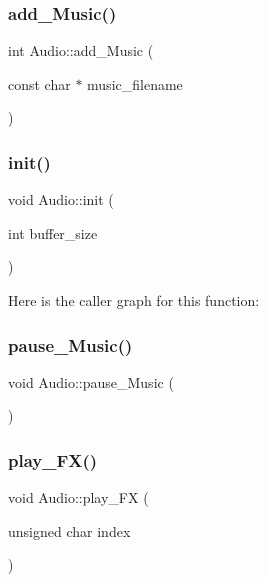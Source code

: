 \mbox{\label{namespace_audio_a2be55422c7a9a1eed7d50918d9a8ab91}} 
\subsubsection{\texorpdfstring{add\+\_\+\+Music()}{add\_Music()}}
{\footnotesize\ttfamily int Audio\+::add\+\_\+\+Music (\begin{DoxyParamCaption}\item[{const char $\ast$}]{music\+\_\+filename }\end{DoxyParamCaption})}

\mbox{\label{namespace_audio_ace2497ef479633bcdaa8239458a4f3e9}} 
\subsubsection{\texorpdfstring{init()}{init()}}
{\footnotesize\ttfamily void Audio\+::init (\begin{DoxyParamCaption}\item[{int}]{buffer\+\_\+size }\end{DoxyParamCaption})}

Here is the caller graph for this function\+:
\mbox{\label{namespace_audio_a4ce3b7bd257437e473a5e08cb0caa618}} 
\subsubsection{\texorpdfstring{pause\+\_\+\+Music()}{pause\_Music()}}
{\footnotesize\ttfamily void Audio\+::pause\+\_\+\+Music (\begin{DoxyParamCaption}{ }\end{DoxyParamCaption})}

\mbox{\label{namespace_audio_a8efc389bdd994d729c09970f87c9f707}} 
\subsubsection{\texorpdfstring{play\+\_\+\+F\+X()}{play\_FX()}}
{\footnotesize\ttfamily void Audio\+::play\+\_\+\+FX (\begin{DoxyParamCaption}\item[{unsigned char}]{index }\end{DoxyParamCaption})}

